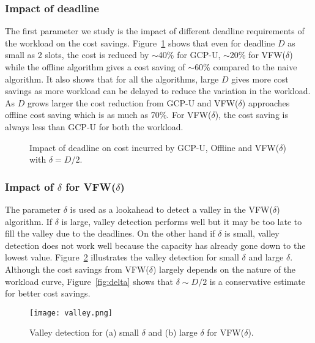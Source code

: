 \documentclass[10pt,conference,compsocconf,letterpaper]{IEEEtran}
\begin{document}
\subsubsection*{Impact of deadline}
The first parameter we study is the impact of different deadline requirements of the workload on the cost savings. Figure~\ref{fig:deadline} shows that even for deadline $D$ as small as 2 slots, the cost is reduced by $\sim$40\% for GCP-U, $\sim$20\% for VFW($\delta$) while the offline algorithm gives a cost saving of $\sim$60\% compared to the naive algorithm. It also shows that for all the algorithms, large $D$ gives more cost savings as more workload can be delayed to reduce the variation in the workload. As $D$ grows larger the cost reduction from GCP-U and VFW($\delta$) approaches offline cost saving which is as much as 70\%. For VFW($\delta$), the cost saving is always less than GCP-U for both the workload.





\begin{figure}[!t]
\centerline{
\hfil
{}}
\caption{Impact of deadline on cost incurred by GCP-U, Offline and VFW($\delta$) with $\delta=D/2$. }
\label{fig:deadline}
\end{figure}




\subsubsection*{Impact of $\delta$ for VFW($\delta$)}
The parameter $\delta$ is used as a lookahead to detect a valley in the VFW($\delta$) algorithm. If $\delta$ is large, valley detection performs well but it may be too late to fill the valley due to the deadlines. On the other hand if $\delta$ is small, valley detection does not work well because the capacity has already gone down to the lowest value. Figure~\ref{fig:valleydetect} illustrates the valley detection for small $\delta$ and large $\delta$. Although the cost savings from VFW($\delta$) largely depends on the nature of the workload curve, Figure~\ref{fig:delta} shows that $\delta\sim D/2$ is a conservative estimate for better cost savings.



\begin{figure}[!t]
\begin{center}
\texttt{[image: valley.png]}
\caption{Valley detection for (a) small $\delta$ and (b) large $\delta$ for VFW($\delta$).}
\label{fig:valleydetect}
\end{center}
\end{figure}
\end{document}
